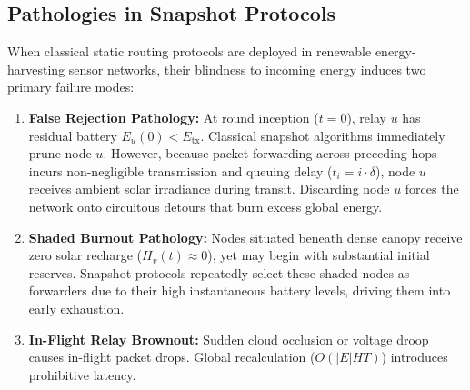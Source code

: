 \documentclass[conference]{IEEEtran}
\begin{document}
\subsection{Pathologies in Snapshot Protocols}
When classical static routing protocols are deployed in renewable energy-harvesting sensor networks, their blindness to incoming energy induces two primary failure modes:
\begin{enumerate}
    \item \textbf{False Rejection Pathology:} At round inception ($t = 0$), relay $u$ has residual battery $E_u(0) < E_{\text{tx}}$. Classical snapshot algorithms immediately prune node $u$. However, because packet forwarding across preceding hops incurs non-negligible transmission and queuing delay ($t_i = i \cdot \delta$), node $u$ receives ambient solar irradiance during transit. Discarding node $u$ forces the network onto circuitous detours that burn excess global energy.
    \item \textbf{Shaded Burnout Pathology:} Nodes situated beneath dense canopy receive zero solar recharge ($H_v(t) \approx 0$), yet may begin with substantial initial reserves. Snapshot protocols repeatedly select these shaded nodes as forwarders due to their high instantaneous battery levels, driving them into early exhaustion.
    \item \textbf{In-Flight Relay Brownout:} Sudden cloud occlusion or voltage droop causes in-flight packet drops. Global recalculation ($O(|E|HT)$) introduces prohibitive latency.
\end{enumerate}
\end{document}
